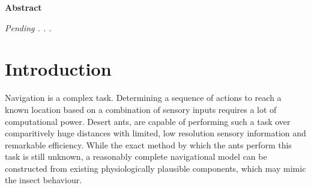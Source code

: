 \documentclass[a4paper,11pt,twoside,openright]{article}
\let\oldsection\section
\def\section{\cleardoublepage\oldsection}
\begin{document}
\newpage
\thispagestyle{empty}
\mbox{}
\newpage

\centering
{\LARGE\textbf{Abstract}}
\begin{flushleft}
  {\small \textit{Pending . . .}}
\end{flushleft}

\newpage

\tableofcontents
\newpage

\listoffigures
\newpage

\listoftables
\newpage
\thispagestyle{empty}
\mbox{}
\newpage


\raggedright

\section{ Introduction }
Navigation is a complex task. Determining a sequence of actions to reach a
known location based on a combination of sensory inputs requires a lot of
computational power. Desert ants, are capable of performing such a task
over comparitively huge distances with limited, low resolution sensory
information and remarkable efficiency. While the exact method by which
the ants perform this task is still unknown, a reasonably complete navigational
model can be constructed from existing physiologically plausible components,
which may mimic the insect behaviour.
\newline
\par
\end{document}
